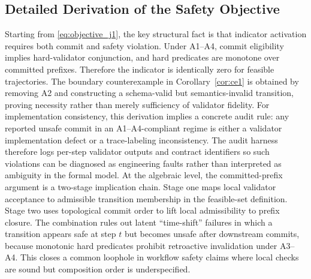 \documentclass{article} %
\begin{document}
\subsection{Detailed Derivation of the Safety Objective}
Starting from \eqref{eq:objective_j1}, the key structural fact is that indicator activation requires both commit and safety violation. Under A1--A4, commit eligibility implies hard-validator conjunction, and hard predicates are monotone over committed prefixes. Therefore the indicator is identically zero for feasible trajectories. The boundary counterexample in Corollary~\ref{cor:ce1} is obtained by removing A2 and constructing a schema-valid but semantics-invalid transition, proving necessity rather than merely sufficiency of validator fidelity.
For implementation consistency, this derivation implies a concrete audit rule: any reported unsafe commit in an A1--A4-compliant regime is either a validator implementation defect or a trace-labeling inconsistency. The audit harness therefore logs per-step validator outputs and contract identifiers so such violations can be diagnosed as engineering faults rather than interpreted as ambiguity in the formal model.
At the algebraic level, the committed-prefix argument is a two-stage implication chain. Stage one maps local validator acceptance to admissible transition membership in the feasible-set definition. Stage two uses topological commit order to lift local admissibility to prefix closure. The combination rules out latent ``time-shift'' failures in which a transition appears safe at step $t$ but becomes unsafe after downstream commits, because monotonic hard predicates prohibit retroactive invalidation under A3--A4. This closes a common loophole in workflow safety claims where local checks are sound but composition order is underspecified.
\end{document}
